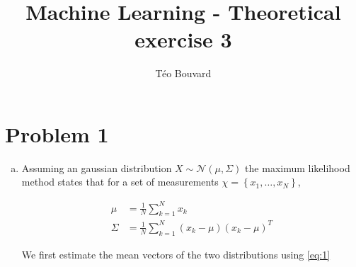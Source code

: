 \documentclass[a4paper, 10pt, twoside]{article}
\begin{document}
\title{Machine Learning - Theoretical exercise 3}
\author{T\'eo Bouvard}
\maketitle

\section*{Problem 1}
\begin{enumerate}[a)]
    \item Assuming an gaussian distribution $X \sim \mathcal{N}(\mu, \Sigma)$ the maximum likelihood method states that for a set of measurements $\chi = \left\{x_1, \dots, x_N\right\}$,

          \begin{align}
              \mu    & = \frac{1}{N}\sum_{k=1}^N x_k \label{eq:1}                       \\
              \Sigma & = \frac{1}{N}\sum_{k=1}^N (x_k - \mu) (x_k - \mu)^T \label{eq:2}
          \end{align}

          We first estimate the mean vectors of the two distributions using \eqref{eq:1}


\end{enumerate}
\end{document}
